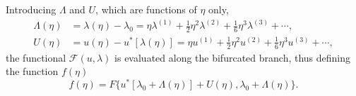 \documentclass[12pt, final]{scrartcl}
\theoremstyle{definition}
\newcommand{\order}[2][1]{#2^{(#1)}}
\begin{document}
Introducing $\Lambda$ and $U$, which are functions of $η$ only,
\begin{align}
  \label{eq:20211112155446}
  \Lambda(η) & = \lambda(η) - \lambda_0 = η \order[1]\lambda + \tfrac{1}{2} η^2 \order[2]\lambda + \tfrac{1}{6} η^3 \order[3]\lambda + \cdots,\\
  \label{eq:20211112113028}
  U(η) & = u(η) - u^{\ast}[\lambda(η)] = η \order[1]u + \tfrac{1}{2} η^2 \order[2]u + \tfrac{1}{6} η^3 \order[3]u + \cdots,
\end{align}
the functional $\mathcal{F}(u, \lambda)$ is evaluated along the bifurcated branch,
thus defining the function $f(η)$
\begin{equation*}
  f(η) = F\{ u^{\ast} [\lambda_0 + \Lambda(η)] + U(η), \lambda_0 + \Lambda(η) \}.
\end{equation*}
\end{document}
